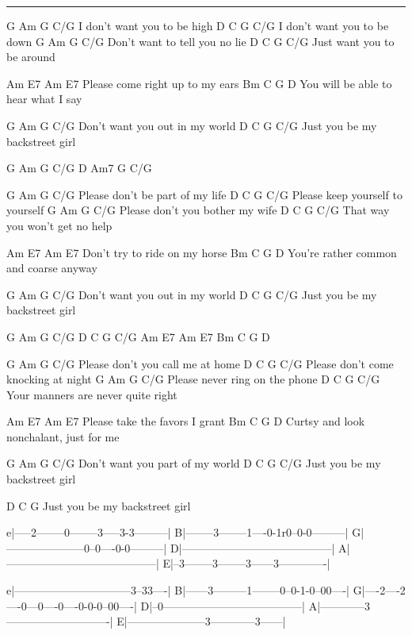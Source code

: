 \noindent\rule{\columnwidth}{1pt}

\begin{multicols}{2}
\begin{lstsong}
G            Am        G   C/G
I don't want you to be high
D            C         G   C/G
I don't want you to be down
G             Am          G  C/G
Don't want to tell you no lie
D             C      G    C/G
Just want you to be around 

Am                E7       Am  E7
Please come right up to my ears
Bm          C       G           D
You will be able to hear what I say 

G              Am        G    C/G
Don't want you out in my world
D           C             G   C/G
Just you be my backstreet girl 

G Am G C/G  D Am7 G C/G

G              Am          G   C/G
Please don't be part of my life
D               C           G   C/G
Please keep yourself to yourself
G                Am        G   C/G
Please don't you bother my wife
D            C            G   C/G
That way you won't get no help 

Am           E7         Am  E7
Don't try to ride on my horse
Bm            C          G         D
You're rather common and coarse anyway

G              Am        G    C/G
Don't want you out in my world
D           C             G   C/G
Just you be my backstreet girl 


G Am G C/G  D C G C/G
Am E7 Am  E7 Bm C G D

G                Am         G   C/G
Please don't you call me at home
D                 C           G   C/G
Please don't come knocking at night
G            Am          G   C/G
Please never ring on the phone
D                C           G   C/G
Your manners are never quite right 

Am              E7       Am  E7
Please take the favors I grant
Bm         C          G              D
Curtsy and look nonchalant, just for me 

G              Am         G    C/G
Don't want you part of my world
D           C             G   C/G
Just you be my backstreet girl 

D           C             G   
Just you be my backstreet girl 
\end{lstsong}

\begin{lsttab}
e|-----2--------0--------3-----3-3---------|
B|--------3--------1----0-1r0--0-0---------|
G|---------------------0--0----0-0---------|
D|-----------------------------------------|
A|-----------------------------------------|
E|--3--------3--------3------3-------------|

e|--------------------------------3--33----|
B|------3---------1--------0--0-1-0--00----|
G|----2----2----0---0----0----0-0-0--00----|
D|--0--------------------------------------|
A|------------3----------------------------|
E|---------------------3------------3------|
\end{lsttab}
\end{multicols}
\newpage

